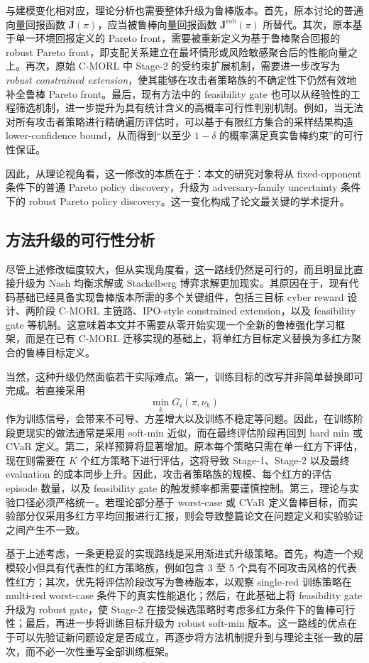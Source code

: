 \documentclass[12pt,a4paper]{article}
\begin{document}
与建模变化相对应，理论分析也需要整体升级为鲁棒版本。首先，原本讨论的普通向量回报函数 $\mathbf{J}(\pi)$，应当被鲁棒向量回报函数 $\mathbf{J}^{\mathrm{rob}}(\pi)$ 所替代。其次，原本基于单一环境回报定义的 Pareto front，需要被重新定义为基于鲁棒聚合回报的 robust Pareto front，即支配关系建立在最坏情形或风险敏感聚合后的性能向量之上。再次，原始 C-MORL 中 Stage-2 的受约束扩展机制，需要进一步改写为 \emph{robust constrained extension}，使其能够在攻击者策略族的不确定性下仍然有效地补全鲁棒 Pareto front\cite{CMORL_ICLR2025}。最后，现有方法中的 feasibility gate 也可以从经验性的工程筛选机制，进一步提升为具有统计含义的高概率可行性判别机制。例如，当无法对所有攻击者策略进行精确遍历评估时，可以基于有限红方集合的采样结果构造 lower-confidence bound，从而得到“以至少 $1-\delta$ 的概率满足真实鲁棒约束”的可行性保证。

因此，从理论视角看，这一修改的本质在于：本文的研究对象将从 fixed-opponent 条件下的普通 Pareto policy discovery，升级为 adversary-family uncertainty 条件下的 robust Pareto policy discovery。这一变化构成了论文最关键的学术提升。

\subsection{方法升级的可行性分析}

尽管上述修改幅度较大，但从实现角度看，这一路线仍然是可行的，而且明显比直接升级为 Nash 均衡求解或 Stackelberg 博弈求解更加现实。其原因在于，现有代码基础已经具备实现鲁棒版本所需的多个关键组件，包括三目标 cyber reward 设计、两阶段 C-MORL 主链路、IPO-style constrained extension，以及 feasibility gate 等机制。这意味着本文并不需要从零开始实现一个全新的鲁棒强化学习框架，而是在已有 C-MORL 迁移实现的基础上，将单红方目标定义替换为多红方聚合的鲁棒目标定义。

当然，这种升级仍然面临若干实际难点。第一，训练目标的改写并非简单替换即可完成。若直接采用
\[
\min_{k} G_i(\pi,\nu_k)
\]
作为训练信号，会带来不可导、方差增大以及训练不稳定等问题。因此，在训练阶段更现实的做法通常是采用 soft-min 近似，而在最终评估阶段再回到 hard min 或 CVaR 定义。第二，采样预算将显著增加。原本每个策略只需在单一红方下评估，现在则需要在 $K$ 个红方策略下进行评估，这将导致 Stage-1、Stage-2 以及最终 evaluation 的成本同步上升。因此，攻击者策略族的规模、每个红方的评估 episode 数量，以及 feasibility gate 的触发频率都需要谨慎控制。第三，理论与实验口径必须严格统一。若理论部分基于 worst-case 或 CVaR 定义鲁棒目标，而实验部分仅采用多红方平均回报进行汇报，则会导致整篇论文在问题定义和实验验证之间产生不一致。

基于上述考虑，一条更稳妥的实现路线是采用渐进式升级策略。首先，构造一个规模较小但具有代表性的红方策略族，例如包含 $3$ 至 $5$ 个具有不同攻击风格的代表性红方；其次，优先将评估阶段改写为鲁棒版本，以观察 single-red 训练策略在 multi-red worst-case 条件下的真实性能退化；然后，在此基础上将 feasibility gate 升级为 robust gate，使 Stage-2 在接受候选策略时考虑多红方条件下的鲁棒可行性；最后，再进一步将训练目标升级为 robust soft-min 版本。这一路线的优点在于可以先验证新问题设定是否成立，再逐步将方法机制提升到与理论主张一致的层次，而不必一次性重写全部训练框架。
\end{document}
